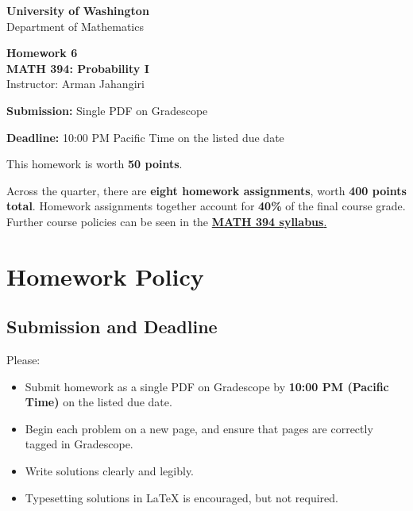 \documentclass[11pt]{article}
\newcommand{\course}{MATH 394: Probability I}
\newcommand{\department}{Department of Mathematics}
\newcommand{\university}{University of Washington}
\begin{document}
\begin{titlepage}
\centering
\vspace*{1.2cm}

{\Large \textbf{\university}}\\
{\large \department}

\vspace{1.5cm}

{\Huge \color{uwpurple}\textbf{Homework 6}}\\[0.25cm]
{\Large \textbf{\course}}\\[0.25cm]
{\large Instructor: Arman Jahangiri}

\vspace{1cm}

\begin{tcolorbox}[width=0.78\textwidth,colback=softpurple,colframe=uwpurple,boxrule=0.9pt,arc=3mm]
\centering
\textbf{Submission:} Single PDF on Gradescope

\textbf{Deadline:} 10:00 PM Pacific Time on the listed due date
\end{tcolorbox}

\vspace{0.8cm}

\begin{tcolorbox}[width=0.86\textwidth,colback=white,colframe=uwgold,boxrule=0.8pt,arc=3mm]
This homework is worth \textbf{50 points}.

Across the quarter, there are \textbf{eight homework assignments}, worth \textbf{400 points total}. Homework assignments together account for \textbf{40\%} of the final course grade. Further course policies can be seen in the \href{https://armanjg.github.io/MATH-394-Probability-1-v2/}{\textbf{MATH 394 syllabus}.}
\end{tcolorbox}

\vfill
\end{titlepage}

\section*{Homework Policy}

\subsection*{Submission and Deadline}

Please:

\begin{itemize}[leftmargin=*]
    \item Submit homework as a single PDF on Gradescope by \textbf{10:00 PM (Pacific Time)} on the listed due date.
    \item Begin each problem on a new page, and ensure that pages are correctly tagged in Gradescope.
    \item Write solutions clearly and legibly.
    \item Typesetting solutions in LaTeX is encouraged, but not required.
\end{itemize}
\end{document}
